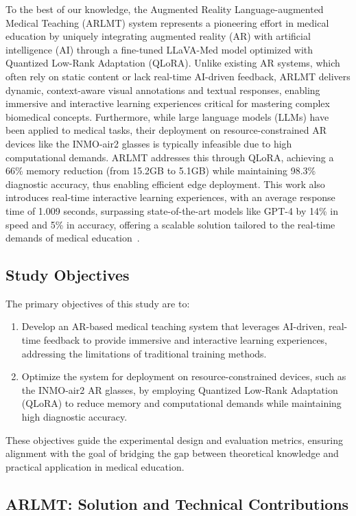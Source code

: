 \documentclass[10pt,letterpaper]{article}
\begin{document}
To the best of our knowledge, the Augmented Reality Language-augmented Medical Teaching (ARLMT) system represents a pioneering effort in medical education by uniquely integrating augmented reality (AR) with artificial intelligence (AI) through a fine-tuned LLaVA-Med model optimized with Quantized Low-Rank Adaptation (QLoRA). Unlike existing AR systems, which often rely on static content or lack real-time AI-driven feedback, ARLMT delivers dynamic, context-aware visual annotations and textual responses, enabling immersive and interactive learning experiences critical for mastering complex biomedical concepts. Furthermore, while large language models (LLMs) have been applied to medical tasks, their deployment on resource-constrained AR devices like the INMO-air2 glasses is typically infeasible due to high computational demands. ARLMT addresses this through QLoRA, achieving a 66\% memory reduction (from 15.2GB to 5.1GB) while maintaining 98.3\% diagnostic accuracy, thus enabling efficient edge deployment. This work also introduces real-time interactive learning experiences, with an average response time of 1.009 seconds, surpassing state-of-the-art models like GPT-4 by 14\% in speed and 5\% in accuracy, offering a scalable solution tailored to the real-time demands of medical education~\cite{liu2023llava, dettmers2023qlora, battineni2024ai}.


\subsection*{Study Objectives}

The primary objectives of this study are to:
\begin{enumerate}
    \item Develop an AR-based medical teaching system that leverages AI-driven, real-time feedback to provide immersive and interactive learning experiences, addressing the limitations of traditional training methods.
    \item Optimize the system for deployment on resource-constrained devices, such as the INMO-air2 AR glasses, by employing Quantized Low-Rank Adaptation (QLoRA) to reduce memory and computational demands while maintaining high diagnostic accuracy.
\end{enumerate}
These objectives guide the experimental design and evaluation metrics, ensuring alignment with the goal of bridging the gap between theoretical knowledge and practical application in medical education.

\subsection*{ARLMT: Solution and Technical Contributions}
\end{document}

